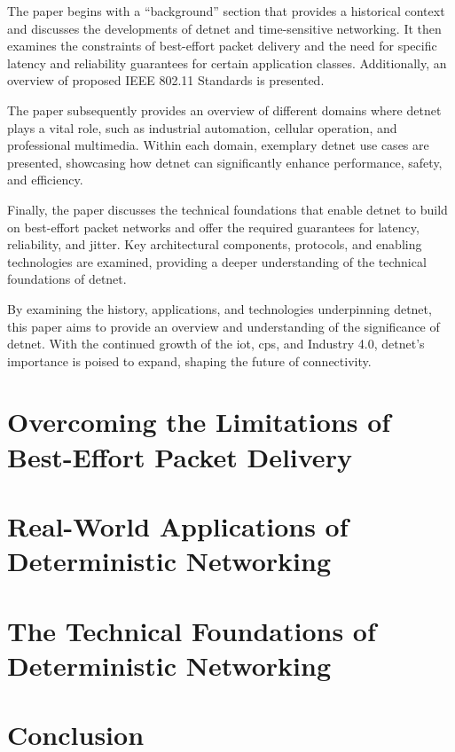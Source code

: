 \documentclass[runningheads]{llncs}
\begin{document}
The paper begins with a ``background'' section that provides a historical context and discusses the developments of \gls{detnet} and time-sensitive networking. It then examines the constraints of best-effort packet delivery and the need for specific latency and reliability guarantees for certain application classes. Additionally, an overview of proposed IEEE 802.11 Standards is presented.

The paper subsequently provides an overview of different domains where \gls{detnet} plays a vital role, such as industrial automation, cellular operation, and professional multimedia. Within each domain, exemplary \gls{detnet} use cases are presented, showcasing how \gls{detnet} can significantly enhance performance, safety, and efficiency.

Finally, the paper discusses the technical foundations that enable \gls{detnet} to build on best-effort packet networks and offer the required guarantees for latency, reliability, and jitter. Key architectural components, protocols, and enabling technologies are examined, providing a deeper understanding of the technical foundations of \gls{detnet}.

By examining the history, applications, and technologies underpinning \gls{detnet}, this paper aims to provide an overview and understanding of the significance of \gls{detnet}. With the continued growth of the \gls{iot}, \gls{cps}, and Industry 4.0, \gls{detnet}'s importance is poised to expand, shaping the future of connectivity.

\section{Overcoming the Limitations of Best-Effort Packet Delivery}
\section{Real-World Applications of Deterministic Networking}
\section{The Technical Foundations of Deterministic Networking}
\section{Conclusion}

\printnoidxglossary[type=acronym,sort=letter,title=Abbreviations]



\end{document}
